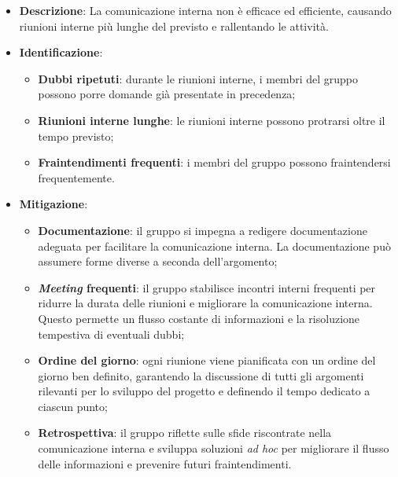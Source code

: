 \label{risk:comunicazione interna carente}
\begin{itemize}
	\item \textbf{Descrizione}:
	      La comunicazione interna non è efficace ed efficiente, causando riunioni
	      interne più lunghe del previsto e rallentando le attività.
	\item \textbf{Identificazione}:
	      \begin{itemize}
		      \item \textbf{Dubbi ripetuti}: durante le riunioni interne, i
		            membri del gruppo possono porre domande già presentate in
		            precedenza;

		      \item \textbf{Riunioni interne lunghe}: le riunioni interne
		            possono protrarsi oltre il tempo previsto;

		      \item \textbf{Fraintendimenti frequenti}: i membri del gruppo
		            possono fraintendersi frequentemente.

	      \end{itemize}
	\item \textbf{Mitigazione}:
	      \begin{itemize}
		      \item \textbf{Documentazione}: il gruppo si impegna a redigere 
			  		documentazione adeguata per facilitare la comunicazione interna. 
					La documentazione può assumere forme diverse a seconda dell'argomento;

		      \item \textbf{\textit{Meeting} frequenti}: il gruppo stabilisce incontri interni 
			  		frequenti per ridurre la durata delle riunioni e migliorare la comunicazione 
					interna. Questo permette un flusso costante di informazioni e la risoluzione 
					tempestiva di eventuali dubbi;

		      \item \textbf{Ordine del giorno}: ogni riunione viene pianificata con un ordine 
			  		del giorno ben definito, garantendo la discussione di tutti gli argomenti 
					rilevanti per lo sviluppo del progetto e definendo il tempo dedicato a 
					ciascun punto;

		      \item \textbf{Retrospettiva}: il gruppo riflette sulle sfide riscontrate nella 
			  		comunicazione interna e sviluppa soluzioni \textit{ad hoc} per migliorare 
					il flusso delle informazioni e prevenire futuri fraintendimenti.
	      \end{itemize}
\end{itemize}
